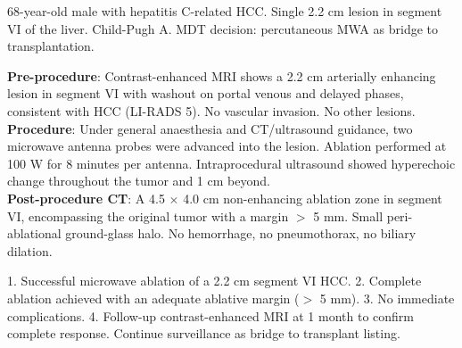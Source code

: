 \begin{testbox}[Indications:]
68-year-old male with hepatitis C-related HCC. Single 2.2 cm lesion in segment VI of the liver. Child-Pugh A. MDT decision: percutaneous MWA as bridge to transplantation.
\end{testbox}
\begin{refbox}[Findings:]
\textbf{Pre-procedure}: Contrast-enhanced MRI shows a 2.2 cm arterially enhancing lesion in segment VI with washout on portal venous and delayed phases, consistent with HCC (LI-RADS 5). No vascular invasion. No other lesions.\\
\textbf{Procedure}: Under general anaesthesia and CT/ultrasound guidance, two microwave antenna probes were advanced into the lesion. Ablation performed at 100 W for 8 minutes per antenna. Intraprocedural ultrasound showed hyperechoic change throughout the tumor and 1 cm beyond.\\
\textbf{Post-procedure CT}: A 4.5 $\times$ 4.0 cm non-enhancing ablation zone in segment VI, encompassing the original tumor with a margin $>$ 5 mm. Small peri-ablational ground-glass halo. No hemorrhage, no pneumothorax, no biliary dilation.
\end{refbox}
\begin{pearlbox}[Impression:]
1. Successful microwave ablation of a 2.2 cm segment VI HCC.
2. Complete ablation achieved with an adequate ablative margin ($>$ 5 mm).
3. No immediate complications.
4. Follow-up contrast-enhanced MRI at 1 month to confirm complete response. Continue surveillance as bridge to transplant listing.
\end{pearlbox}

\clearpage
